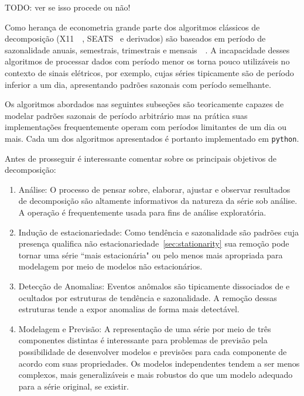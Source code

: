 TODO: ver se isso procede ou não!

Como herança de econometria grande parte dos algoritmos clássicos de
decomposição (X11~~\cite{x11}, SEATS~\cite[capítulo~5.2]{SEATS} e derivados) são
baseados em período de sazonalidade anuais, semestrais, trimestrais e
mensais~~\cite{athana}. A incapacidade desses algoritmos de processar dados com
período menor os torna pouco utilizáveis no contexto de sinais elétricos, por
exemplo, cujas séries tipicamente são de período inferior a um dia,
apresentando padrões sazonais com período semelhante.

Os algoritmos abordados nas seguintes subseções são teoricamente capazes de
modelar padrões sazonais de período arbitrário mas na prática suas
implementações frequentemente operam com períodos limitantes de um dia ou
mais. Cada um dos algoritmos apresentados é portanto implementado em
\verb+python+.

Antes de prosseguir é interessante comentar sobre os principais objetivos de
decomposição:

\begin{enumerate}

    \item Análise: O processo de pensar sobre, elaborar, ajustar e observar
    resultados de decomposição são altamente informativos da natureza da
    série sob análise. A operação é frequentemente usada para fins de análise
    exploratória.

    \item Indução de estacionariedade: Como tendência e sazonalidade são
    padrões cuja presença qualifica não estacionariedade~\ref{sec:stationarity}
    sua remoção pode tornar uma série ``mais estacionária" ou pelo menos mais
    apropriada para modelagem por meio de modelos não estacionários.

    \item Detecção de Anomalias: Eventos anômalos são tipicamente dissociados
    de e ocultados por estruturas de tendência e sazonalidade. A remoção
    dessas estruturas tende a expor anomalias de forma mais detectável.

    \item Modelagem e Previsão: A representação de uma série por meio de três
    componentes distintas é interessante para problemas de previsão pela
    possibilidade de desenvolver modelos e previsões para cada componente de
    acordo com suas propriedades. Os modelos independentes tendem a ser menos
    complexos, mais generalizáveis e mais robustos do que um modelo adequado
    para a série original, se existir.

\end{enumerate}

